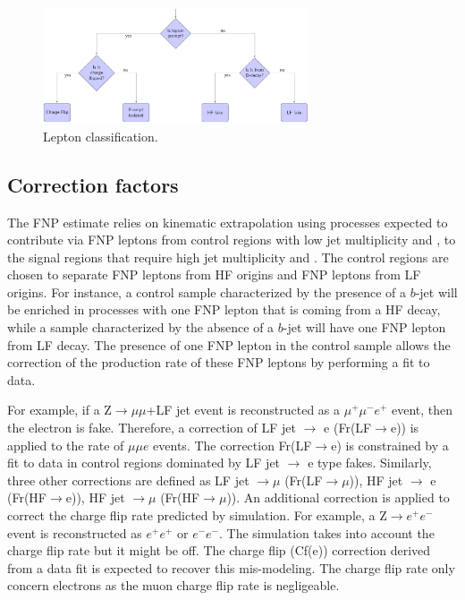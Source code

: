 \begin{figure}[t!]
\centering
\includegraphics[width=0.7\textwidth]{MC-tmpl}
\caption
{Lepton classification.
}
\label{Fig:fakes_classification}
\end{figure}

\subsection{Correction factors}

The FNP estimate relies on kinematic extrapolation using processes expected to contribute via FNP leptons from control regions 
with low jet multiplicity and \met, to the signal regions that require high jet multiplicity and \met. 
The control regions are chosen to separate FNP leptons from HF origins and FNP leptons from LF origins.
For instance, a control sample characterized by the presence of a $b$-jet will be enriched in processes with one FNP lepton that is 
coming from a HF decay, while a sample characterized by the absence of a $b$-jet will have one FNP lepton from LF decay.
The presence of one FNP lepton in the control sample allows the correction of the production rate of these FNP leptons 
by performing a fit to data. 

For example, if a Z$\to\mu\mu$+LF jet event is reconstructed as a $\mu^+\mu^-e^+$ event, then the electron is fake.
Therefore, a correction of LF jet $\to$ e (Fr(LF$\to$e)) is applied to the rate of $\mu\mu e$ events. The correction Fr(LF$\to$e)
is constrained by a fit to data in control regions dominated by LF jet $\to$ e type fakes. 
Similarly, three other corrections are defined as LF jet $\to\mu$ (Fr(LF$\to\mu$)),  HF jet $\to$ e (Fr(HF$\to$e)),  
HF jet $\to\mu$ (Fr(HF$\to\mu$)). An additional correction is applied to correct the charge flip rate predicted by simulation.
For example, a Z$\to e^+e^-$ event is reconstructed as $e^+e^+$ or $e^-e^-$. The simulation takes into account the charge flip 
rate but it might be off. The charge flip (Cf(e)) correction derived from a data fit is expected to recover this mis-modeling.
The charge flip rate only concern electrons as the muon charge flip rate is negligeable.

